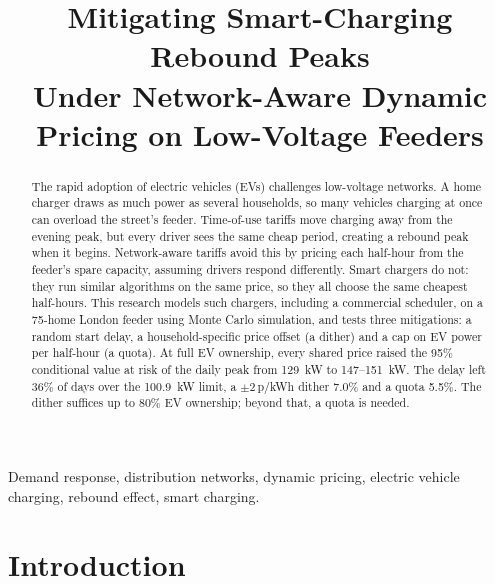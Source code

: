 \documentclass[conference]{IEEEtran}
\newcommand{\pkwh}{\,p/kWh}
\begin{document}
\title{Mitigating Smart-Charging Rebound Peaks\\Under
Network-Aware Dynamic Pricing on Low-Voltage Feeders}

\author{
}

\maketitle

\begin{abstract}
The rapid adoption of electric vehicles (EVs) challenges low-voltage
networks. A home charger draws as much power as several
households, so many vehicles charging at once can overload the street's
feeder. Time-of-use tariffs move charging away from
the evening peak, but every driver sees the same cheap period, creating a
rebound peak when it begins. Network-aware tariffs avoid this by pricing each
half-hour from the feeder's spare capacity, assuming drivers respond
differently. Smart chargers do not: they run similar algorithms on the
same price, so they all choose the same cheapest half-hours. This research
models such chargers, including a commercial scheduler, on a 75-home London
feeder using Monte Carlo simulation, and tests three mitigations:
a random start delay, a household-specific price offset (a dither) and a cap
on EV power per half-hour (a quota). At full EV ownership, every shared
price raised the 95\% conditional value at risk of the daily peak from
129~kW to 147--151~kW. The delay left 36\% of days over the 100.9~kW limit, a
$\pm$2\pkwh{} dither 7.0\% and a quota 5.5\%. The dither suffices up to 80\%
EV ownership; beyond that, a quota is needed.
\end{abstract}

\begin{IEEEkeywords}
Demand response, distribution networks, dynamic pricing, electric vehicle
charging, rebound effect, smart charging.
\end{IEEEkeywords}

\section{Introduction}
\end{document}
